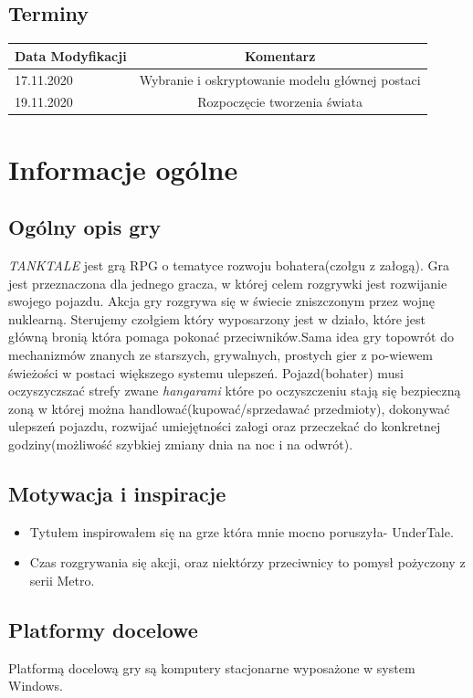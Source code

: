\documentclass{article}
\begin{document}
   \subsection{Terminy}
\begin{tabular}{|l|c|}
	\hline
	Data Modyfikacji  & Komentarz\\
	\hline
	17.11.2020  & Wybranie i oskryptowanie modelu głównej postaci\\
	\hline
	19.11.2020  & Rozpoczęcie tworzenia świata\\

	\hline
\end{tabular}

\newpage

\section{Informacje ogólne}
    \subsection{Ogólny opis gry}
    \emph{TANKTALE} jest grą RPG o tematyce rozwoju bohatera(czołgu z załogą). Gra jest przeznaczona dla jednego gracza, w której celem rozgrywki jest rozwijanie swojego pojazdu. Akcja gry rozgrywa się w świecie zniszczonym przez wojnę nuklearną. Sterujemy czołgiem który wyposarzony jest w działo, które jest główną bronią która pomaga pokonać przeciwników.Sama  idea  gry  topowrót do mechanizmów znanych ze starszych, grywalnych, prostych gier z po-wiewem świeżości w postaci większego systemu ulepszeń. Pojazd(bohater) musi oczyszyczszać strefy zwane \emph{hangarami} które po oczyszczeniu stają się bezpieczną zoną w której można handlować(kupować/sprzedawać przedmioty), dokonywać ulepszeń pojazdu, rozwijać umiejętności załogi oraz przeczekać do konkretnej godziny(możliwość szybkiej zmiany dnia na noc i na odwrót). 
    
    \subsection{Motywacja i inspiracje}
    \begin{itemize}
        \item Tytułem inspirowałem się na grze która mnie mocno poruszyła- UnderTale.
        \item Czas rozgrywania się akcji, oraz niektórzy przeciwnicy to pomysł pożyczony z serii Metro.
    \end{itemize}
    \subsection{Platformy docelowe}
    Platformą docelową gry są komputery stacjonarne wyposażone w system Windows.
\end{document}
